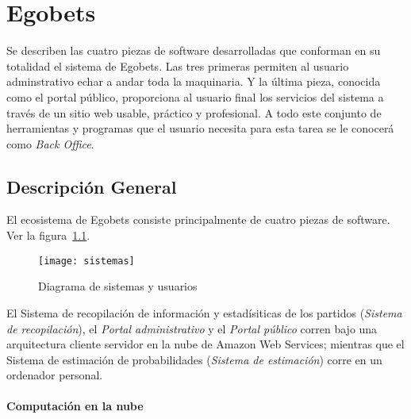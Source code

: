 \chapter{Egobets}
\graphicspath{{/Users/brunomedina/Dropbox/Tesis-Egobets/egobets-notas/resources/diagramas/}}

Se describen las cuatro piezas de software desarrolladas que conforman en su totalidad el sistema de Egobets. Las tres primeras permiten al usuario adminstrativo echar a andar toda la maquinaria. Y la última pieza, conocida como el portal público, proporciona al usuario final los servicios del sistema a través de un sitio web usable, práctico y profesional. 
A todo este conjunto de herramientas y programas que el usuario necesita para esta tarea se le conocerá como \emph{Back Office}.

\section{Descripción General}
El ecosistema de Egobets consiste principalmente de cuatro piezas de software. Ver la figura~\ref{Fig:Sistemas}. 




\begin{figure}[!htb]\centering
   \begin {minipage}{1\textwidth}
     \texttt{[image: sistemas]}
     \caption{Diagrama de sistemas y usuarios}\label{Fig:Sistemas}
   \end{minipage}
\end{figure}

El Sistema de recopilación de información y estadísiticas de los partidos (\emph{Sistema de recopilación}), el \emph{Portal administrativo} y el \emph{Portal público} corren bajo una arquitectura cliente servidor en la nube de Amazon Web Services; mientras que el Sistema de estimación de probabilidades (\emph{Sistema de estimación}) corre en un ordenador personal.


\subsubsection{Computación en la nube}

